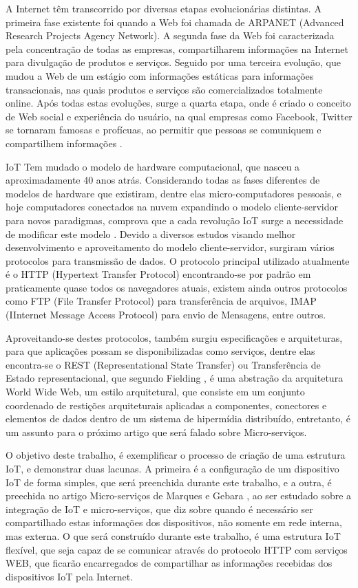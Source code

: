 \documentclass[journal]{IEEEtran}
\begin{document}
A Internet têm transcorrido por diversas etapas evolucionárias distintas. A primeira fase existente foi quando a Web foi chamada de ARPANET (Advanced Research Projects Agency Network). A segunda fase da Web foi caracterizada pela concentração de todas as empresas, compartilharem informações na Internet para divulgação de produtos e serviços. Seguido por uma terceira evolução, que mudou a Web de um estágio com informações estáticas para informações transacionais, nas quais produtos e serviços são comercializados totalmente online. Após todas estas evoluções, surge a quarta etapa, onde é criado o conceito de Web social e experiência do usuário, na qual empresas como Facebook, Twitter se tornaram famosas e profícuas, ao permitir que pessoas se comuniquem e compartilhem informações \cite[p.~6]{Evans}.

IoT Tem mudado o modelo de hardware computacional, que nasceu a aproximadamente 40 anos atrás. Considerando todas as fases diferentes de modelos de hardware que existiram, dentre elas micro-computadores pessoais, e hoje computadores conectados na nuvem expandindo o modelo cliente-servidor para novos paradigmas, comprova que a cada revolução IoT surge a necessidade de modificar este modelo \cite[p.~6]{dzoneone}. Devido a diversos estudos visando melhor desenvolvimento e aproveitamento do modelo cliente-servidor, surgiram vários protocolos para transmissão de dados. O protocolo principal utilizado atualmente é o HTTP (Hypertext Transfer Protocol) encontrando-se por padrão em praticamente quase todos os navegadores atuais, existem ainda outros protocolos como FTP (File Transfer Protocol) para transferência de arquivos, IMAP (IInternet Message Access Protocol) para envio de Mensagens, entre outros. 

Aproveitando-se destes protocolos, também surgiu especificações e arquiteturas, para que aplicações possam se disponibilizadas como serviços, dentre elas encontra-se o REST (Representational State Transfer) ou Transferência de Estado representacional, que segundo Fielding \cite{roythomasfielding2017}, é uma abstração da arquitetura World Wide Web, um estilo  arquitetural, que consiste em um conjunto coordenado de restições arquiteturais aplicadas a componentes, conectores e elementos de dados dentro de um sistema de hipermídia distribuído, entretanto, é um assunto para o próximo artigo que será falado sobre Micro-serviços.

O objetivo deste trabalho, é exemplificar o processo de criação de uma estrutura IoT, e demonstrar duas lacunas. A primeira é a configuração de um dispositivo IoT de forma simples, que será preenchida durante este trabalho, e a outra, é preechida no artigo Micro-serviços de Marques e Gebara \cite{MarquesMunif}, ao ser estudado sobre a integração de IoT e micro-serviços, que diz sobre quando é necessário ser compartilhado estas informações dos dispositivos, não somente em rede interna, mas externa. O que será construído durante este trabalho, é uma estrutura IoT flexível, que seja capaz de se comunicar através do protocolo HTTP com serviços WEB, que ficarão encarregados de compartilhar as informações recebidas dos dispositivos IoT pela Internet.
\end{document}

